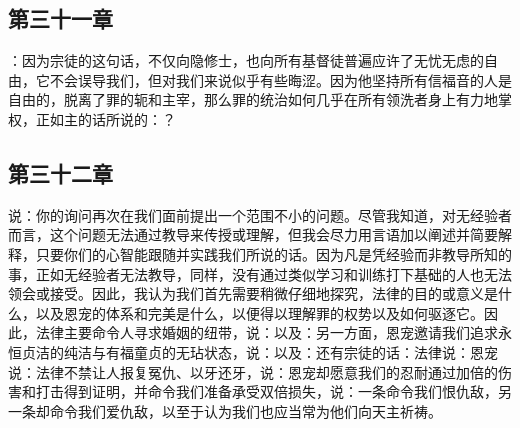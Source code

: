 \subsection{第三十一章}

\par

：因为宗徒的这句话，不仅向隐修士，也向所有基督徒普遍应许了无忧无虑的自由，它不会误导我们，但对我们来说似乎有些晦涩。因为他坚持所有信福音的人是自由的，脱离了罪的轭和主宰，那么罪的统治如何几乎在所有领洗者身上有力地掌权，正如主的话所说的：？ \par


\subsection{第三十二章}

\par

说：你的询问再次在我们面前提出一个范围不小的问题。尽管我知道，对无经验者而言，这个问题无法通过教导来传授或理解，但我会尽力用言语加以阐述并简要解释，只要你们的心智能跟随并实践我们所说的话。因为凡是凭经验而非教导所知的事，正如无经验者无法教导，同样，没有通过类似学习和训练打下基础的人也无法领会或接受。因此，我认为我们首先需要稍微仔细地探究，法律的目的或意义是什么，以及恩宠的体系和完美是什么，以便得以理解罪的权势以及如何驱逐它。因此，法律主要命令人寻求婚姻的纽带，说：以及：另一方面，恩宠邀请我们追求永恒贞洁的纯洁与有福童贞的无玷状态，说：以及：还有宗徒的话：法律说：恩宠说：法律不禁让人报复冤仇、以牙还牙，说：恩宠却愿意我们的忍耐通过加倍的伤害和打击得到证明，并命令我们准备承受双倍损失，说：一条命令我们恨仇敌，另一条却命令我们爱仇敌，以至于认为我们也应当常为他们向天主祈祷。\par


